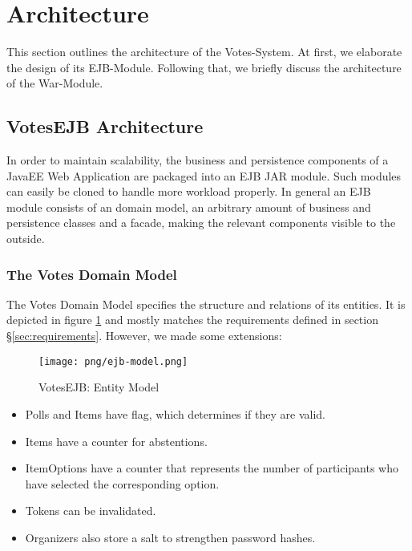 \section{Architecture}
\label{sec:architecture}
This section outlines the architecture of the Votes-System.
At first, we elaborate the design of its EJB-Module.
Following that, we briefly discuss the architecture of the War-Module.


\subsection{VotesEJB Architecture}
\label{subsec:votesejb-architector}
In order to maintain scalability, the business and persistence components of a JavaEE Web Application are packaged into an EJB JAR module.
Such modules can easily be cloned to handle more workload properly.
In general an EJB module consists of an domain model, an arbitrary amount of business and persistence classes and a facade, making the relevant components visible to the outside.

\subsubsection{The Votes Domain Model}
\label{subsubsec:the-votes-domain-model}
The Votes Domain Model specifies the structure and relations of its entities.
It is depicted in figure \ref{figure:ejb-model} and mostly matches the requirements defined in section §\ref{sec:requirements}.
However, we made some extensions:

\begin{figure}[h]
\centering
\texttt{[image: png/ejb-model.png]}
\caption{VotesEJB: Entity Model}
\label{figure:ejb-model}
\end{figure}

\begin{itemize}

\item
Polls and Items have flag, which determines if they are valid.

\item
Items have a counter for abstentions.

\item
ItemOptions have a counter that represents the number of participants who have selected the corresponding option.

\item
Tokens can be invalidated.

\item
Organizers also store a salt to strengthen password hashes.

\end{itemize}



